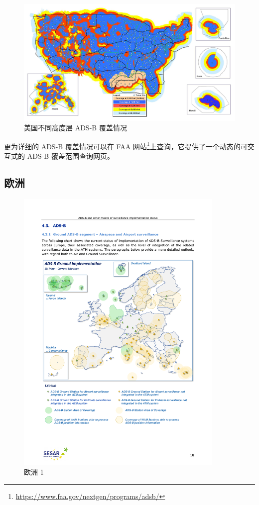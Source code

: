 \begin{figure}[htbp]
\centering
\includegraphics[width=14cm]{pic/ADSB-final.png}
\caption{美国不同高度层 ADS-B 覆盖情况}
\label{fig:ADSB-final}
\end{figure}

更为详细的 ADS-B 覆盖情况可以在 FAA 网站\footnote{\url{https://www.faa.gov/nextgen/programs/adsb/}}上查询，它提供了一个动态的可交互式的 ADS-B 覆盖范围查询网页。

\subsection{欧洲}

\begin{figure}[htbp]
\centering
\includegraphics[width=10cm]{pic/20180515-sesar-ads-b-report_18.pdf}
\caption{欧洲 1}
\label{fig:20180515-sesar-ads-b-report_18}
\end{figure}

